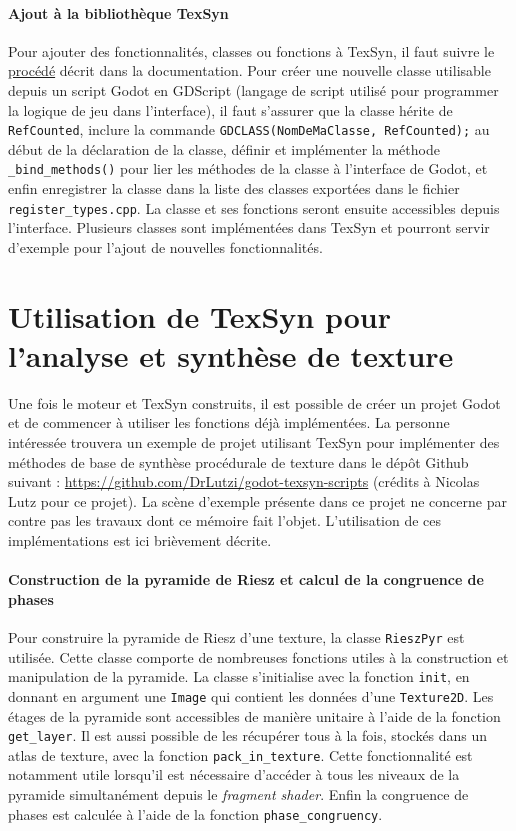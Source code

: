 \paragraph{Ajout à la bibliothèque TexSyn}

Pour ajouter des fonctionnalités, classes ou fonctions à TexSyn, il faut suivre le \href{https://docs.godotengine.org/en/stable/contributing/development/core_and_modules/custom_modules_in_cpp.html}{procédé} décrit dans la documentation. Pour créer une nouvelle classe utilisable depuis un script Godot en GDScript (langage de script utilisé pour programmer la logique de jeu dans l'interface), il faut s'assurer que la classe hérite de \texttt{RefCounted}, inclure la commande \texttt{GDCLASS(NomDeMaClasse, RefCounted);} au début de la déclaration de la classe, définir et implémenter la méthode \texttt{\_bind\_methods()} pour lier les méthodes de la classe à l'interface de Godot, et enfin enregistrer la classe dans la liste des classes exportées dans le fichier \texttt{register\_types.cpp}. La classe et ses fonctions seront ensuite accessibles depuis l'interface. Plusieurs classes sont implémentées dans TexSyn et pourront servir d'exemple pour l'ajout de nouvelles fonctionnalités.

\section{Utilisation de TexSyn pour l'analyse et synthèse de texture}

Une fois le moteur et TexSyn construits, il est possible de créer un projet Godot et de commencer à utiliser les fonctions déjà implémentées. La personne intéressée trouvera un exemple de projet utilisant TexSyn pour implémenter des méthodes de base de synthèse procédurale de texture dans le dépôt Github suivant : \url{https://github.com/DrLutzi/godot-texsyn-scripts} (crédits à Nicolas Lutz pour ce projet). La scène d'exemple présente dans ce projet ne concerne par contre pas les travaux dont ce mémoire fait l'objet. L'utilisation de ces implémentations est ici brièvement décrite.

\paragraph{Construction de la pyramide de Riesz et calcul de la congruence de phases}

Pour construire la pyramide de Riesz d'une texture, la classe \texttt{RieszPyr} est utilisée. Cette classe comporte de nombreuses fonctions utiles à la construction et manipulation de la pyramide. La classe s'initialise avec la fonction \texttt{init}, en donnant en argument une \texttt{Image} qui contient les données d'une \texttt{Texture2D}. Les étages de la pyramide sont accessibles de manière unitaire à l'aide de la fonction \texttt{get\_layer}. Il est aussi possible de les récupérer tous à la fois, stockés dans un atlas de texture, avec la fonction \texttt{pack\_in\_texture}. Cette fonctionnalité est notamment utile lorsqu'il est nécessaire d'accéder à tous les niveaux de la pyramide simultanément depuis le \textit{fragment shader}. Enfin la congruence de phases est calculée à l'aide de la fonction \texttt{phase\_congruency}.

